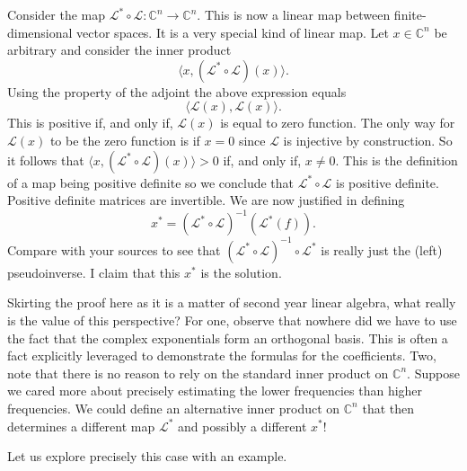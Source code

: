 Consider the map \(\mathcal{L}^* \circ \mathcal{L}: \mathbb{C}^n \to \mathbb{C}^n.\)
This is now a linear map between finite-dimensional vector spaces.
It is a very special kind of linear map.
Let \(x \in \mathbb{C}^n\) be arbitrary and consider the inner product
\[
  \langle x, (\mathcal{L}^* \circ \mathcal{L})(x) \rangle.
\]
Using the property of the adjoint the above expression equals
\[
  \langle \mathcal{L}(x), \mathcal{L}(x) \rangle.
\]
This is positive if, and only if, \(\mathcal{L}(x)\) is equal to zero function.
The only way for \(\mathcal{L}(x)\) to be the zero function is if \(x = 0\) since \(\mathcal{L}\) is injective by construction.
So it follows that \(\langle x, (\mathcal{L}^* \circ \mathcal{L})(x) \rangle > 0\) if, and only if, \(x \neq 0.\)
This is the definition of a map being positive definite so we conclude that \(\mathcal{L}^* \circ \mathcal{L}\) is positive definite.
Positive definite matrices are invertible.
We are now justified in defining
\[
  x^* = \left(\mathcal{L}^* \circ \mathcal{L}\right)^{-1}(\mathcal{L}^*(f)).
\]
Compare with your sources to see that \((\mathcal{L}^* \circ \mathcal{L})^{-1} \circ \mathcal{L}^*\) is really just the (left) pseudoinverse.
I claim that this \(x^*\) is the solution.

Skirting the proof here as it is a matter of second year linear algebra, what really is the value of this perspective?
For one, observe that nowhere did we have to use the fact that the complex exponentials form an orthogonal basis.
This is often a fact explicitly leveraged to demonstrate the formulas for the coefficients.
Two, note that there is no reason to rely on the standard inner product on \(\mathbb{C}^n.\)
Suppose we cared more about precisely estimating the lower frequencies than higher frequencies.
We could define an alternative inner product on \(\mathbb{C}^n\) that then determines a different map \(\mathcal{L}^*\) and possibly a different \(x^*\)!

Let us explore precisely this case with an example.
